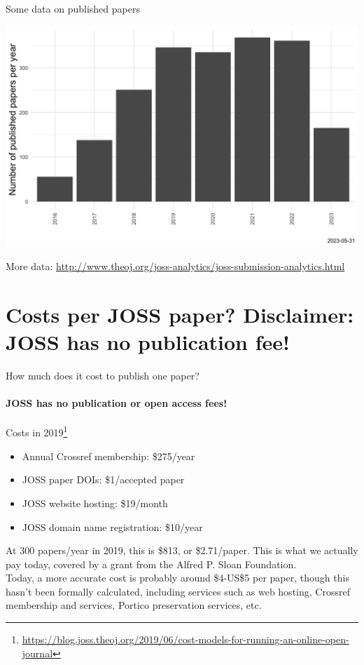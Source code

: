 \begin{frame}{Some data on published papers}

\includegraphics[width=\linewidth]{papers-per-year.png}



{\tiny More data: \url{http://www.theoj.org/joss-analytics/joss-submission-analytics.html}}    
\end{frame}


\section{Costs per JOSS paper? Disclaimer: JOSS has no publication fee!}

\begin{frame}{  How much does it cost to publish one paper?}
\framesubtitle{JOSS has no publication or open access fees! }

\begin{block}{Costs in 2019\footnote{\tiny\url{https://blog.joss.theoj.org/2019/06/cost-models-for-running-an-online-open-journal}}}
\begin{itemize}
\item  Annual Crossref membership: \$275/year
\item  JOSS paper DOIs: \$1/accepted paper
\item  JOSS website hosting: \$19/month
\item  JOSS domain name registration: \$10/year
\end{itemize}
\end{block}
At 300 papers/year in 2019, this is \$813, or \$2.71/paper. This is what we actually pay today, covered by a grant from the Alfred P. Sloan Foundation.\\
\vspace{0.5cm}
Today, a more accurate cost is probably around \$4-US\$5 per paper, though this hasn't been formally calculated, including services such as web hosting, Crossref membership and services, Portico preservation services, etc. 

\end{frame}


